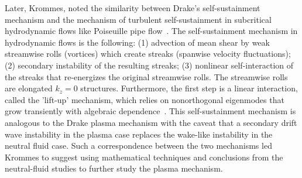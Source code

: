 Later, Krommes, noted the similarity between Drake's self-sustainment mechanism and the mechanism of turbulent self-sustainment in subcritical hydrodynamic flows like Poiseuille pipe 
flow~\cite{krommes1999}. The self-sustainment mechanism in hydrodynamic flows is the following: (1) advection of mean shear by weak streamwise rolls (vortices) which create streaks (spanwise
velocity fluctuations); (2) secondary instability of the resulting streaks; (3) nonlinear self-interaction of the streaks that re-energizes the original streamwise rolls. The streamwise rolls
are elongated $k_z = 0$ structures. Furthermore, the first step is a linear interaction, called the 'lift-up' mechanism, which relies on nonorthogonal eigenmodes that grow transiently with
algebraic dependence~\cite{trefethen1993,waleffe1995,henningson1996}. This self-sustainment mechanism is analogous to the Drake plasma mechanism with the caveat that a secondary drift wave
instability in the plasma case replaces the wake-like instability in the neutral fluid case. Such a correspondence between the two mechanisms led Krommes to suggest using mathematical techniques
and conclusions from the neutral-fluid studies to further study the plasma mechanism. 

